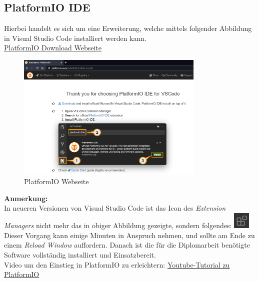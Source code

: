\subsection{PlatformIO IDE}
Hierbei handelt es sich um eine Erweiterung, welche mittels folgender Abbildung in Visual Studio Code installiert werden kann.\\
\href{https://platformio.org/install/ide?install=vscode}{PlatformIO Download Webseite}
\begin{figure}[h]
	\centering
	\includegraphics[width=0.8\textwidth]{bilder/Webseite_PlatformIO.png}
	\caption{PlatformIO Webseite}
\end{figure}

\textbf{Anmerkung:}\\
In neueren Versionen von Visual Studio Code ist das Icon des \textit{Extension Managers} nicht mehr das in obiger Abbildung gezeigte, sondern folgendes:
\includegraphics[align=t,width=0.8cm]{bilder/Icon_Extension_Manager.png}\\

Dieser Vorgang kann einige Minuten in Anspruch nehmen, und sollte am Ende zu einem \textit{Reload Window} auffordern. Danach ist die für die Diplomarbeit benötigte Software vollständig installiert und Einsatzbereit.\\

Video um den Einstieg in PlatformIO zu erleichtern: \href{https://youtu.be/JmvMvIphMnY?t=715}{Youtube-Tutorial zu PlatformIO}\\

\newpage